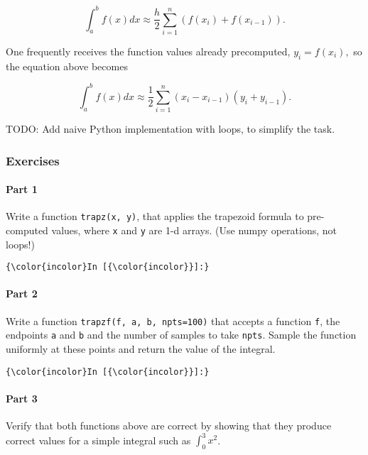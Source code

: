 \documentclass{article}
\begin{document}
\[
   \int_{a}^{b}f(x)dx\approx\frac{h}{2}\sum_{i=1}^{n}\left(f(x_{i})+f(x_{i-1})\right).
\]

One frequently receives the function values already precomputed,
$y_{i}=f(x_{i}),$ so the equation above becomes

\[
   \int_{a}^{b}f(x)dx\approx\frac{1}{2}\sum_{i=1}^{n}\left(x_{i}-x_{i-1}\right)\left(y_{i}+y_{i-1}\right).
\]

    TODO: Add naive Python implementation with loops, to simplify the task.

    \subsubsection{Exercises}

\paragraph{Part 1}

Write a function \texttt{trapz(x, y)}, that applies the trapezoid
formula to pre-computed values, where \texttt{x} and \texttt{y} are 1-d
arrays. (Use numpy operations, not loops!)

    \begin{Verbatim}[commandchars=\\\{\}]
{\color{incolor}In [{\color{incolor}}]:} 
\end{Verbatim}

    \paragraph{Part 2}

Write a function \texttt{trapzf(f, a, b, npts=100)} that accepts a
function \texttt{f}, the endpoints \texttt{a} and \texttt{b} and the
number of samples to take \texttt{npts}. Sample the function uniformly
at these points and return the value of the integral.

    \begin{Verbatim}[commandchars=\\\{\}]
{\color{incolor}In [{\color{incolor}}]:} 
\end{Verbatim}

    \paragraph{Part 3}

Verify that both functions above are correct by showing that they
produce correct values for a simple integral such as $\int_0^3 x^2$.
\end{document}
